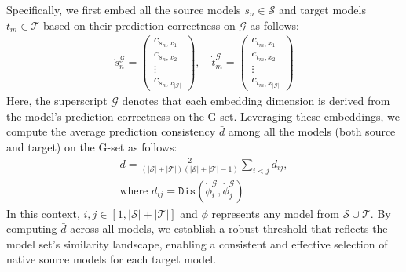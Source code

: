 Specifically, we first embed all the source models $s_n \in \mathcal{S}$ and target models $t_m \in \mathcal{T}$ based on their prediction correctness on $\mathcal{G}$ as follows:
\begin{equation}
    \label{eq2}
    \begin{gathered}
    \dot{s}_n^{\mathcal{G}} = \begin{pmatrix} c_{s_n, x_1} \\ c_{s_n, x_2} \\ \vdots \\ c_{s_n, x_{|\mathcal{G}|}} \end{pmatrix}, \quad
    \dot{t}_m^{\mathcal{G}} = \begin{pmatrix} c_{t_m, x_1} \\ c_{t_m, x_2} \\ \vdots \\ c_{t_m, x_{|\mathcal{G}|}} \end{pmatrix}
    \end{gathered}
\end{equation}
Here, the superscript $\mathcal{G}$ denotes that each embedding dimension is derived from the model's prediction correctness on the G-set. Leveraging these embeddings, we compute the average prediction consistency $\bar{d}$ among all the models (both source and target) on the G-set as follows: 
\begin{equation}
    \begin{gathered}
    \bar{d} = \frac{2}{(|\mathcal{S}| + |\mathcal{T}|)(|\mathcal{S}| + |\mathcal{T}| - 1)} \sum_{i<j} d_{ij}, \\
    \text{where } d_{ij} = \texttt{Dis}\left(\dot{\phi}_i^{\mathcal{G}}, \dot{\phi}_j^{\mathcal{G}}\right)
    \end{gathered}
\end{equation}
In this context, $i, j \in [1, |\mathcal{S}| + |\mathcal{T}|]$ and $\phi$ represents any model from $\mathcal{S} \cup \mathcal{T}$. By computing $\bar{d}$ across all models, we establish a robust threshold that reflects the model set's similarity landscape, enabling a consistent and effective selection of native source models for each target model.

